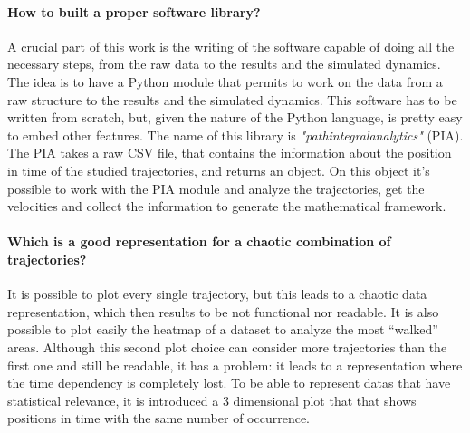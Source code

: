 \documentclass[class=article, crop=false]{standalone}
\begin{document}
\paragraph{How to built a proper software library?}
A crucial part of this work is the writing of the software capable of doing all the necessary steps, from the raw data to the results and the simulated dynamics.
The idea is to have a Python module that permits to work on the data from a raw structure to the results and the simulated dynamics.
This software has to be written from scratch, but, given the nature of the Python language, is pretty easy to embed other features.
The name of this library is \emph{"pathintegralanalytics"} (PIA).
The PIA takes a raw CSV file, that contains the information about the position in time of the studied trajectories, and returns an object.
On this object it's possible to work with the PIA module and analyze the trajectories, get the velocities and collect the information to generate the mathematical framework.


\paragraph{Which is a good representation for a chaotic combination of trajectories?}
It is possible to plot every single trajectory, but this leads to a chaotic data representation, which then results to be not functional nor readable. 
It is also possible to plot easily the heatmap of a dataset to analyze the most “walked” areas. 
Although this second plot choice can consider more trajectories than the first one and still be readable, it has a problem: it leads to a representation where the time dependency is completely lost.
To be able to represent datas that have statistical relevance, it is introduced a 3 dimensional plot that that shows positions in time with the same number of occurrence.


\end{document}
